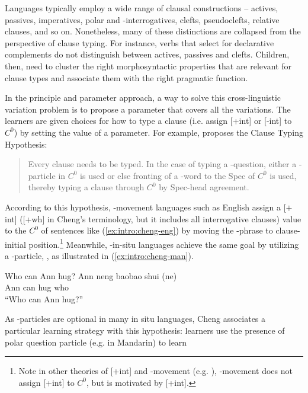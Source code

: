Languages typically employ a wide range of clausal constructions -- actives, passives, imperatives, polar and \twh-interrogatives, clefts, pseudoclefts, relative clauses, and so on. Nonetheless, many of these distinctions are collapsed from the perspective of clause typing. For instance, verbs that select for declarative complements do not distinguish between actives, passives and clefts. Children, then, need to cluster the right morphosyntactic properties that are relevant for clause types and associate them with the right pragmatic function.




In the principle and parameter approach, a way to solve this cross-linguistic variation problem is to propose a parameter that covers all the variations. The learners are given choices for how to type a clause (i.e. assign [+int] or [-int] to $C^{0}$) by setting the value of a parameter. For example, \textcite{cheng1991} proposes the Clause Typing Hypothesis:

\begin{quote}
Every clause needs to be typed. In the case of typing a \twh-question, either a \twh-particle in $C^{0}$ is used or else fronting of a \twh-word to the Spec of $C^{0}$ is used, thereby typing a clause through $C^{0}$ by Spec-head agreement. \hfill \textcite[p.29]{cheng1991}

\end{quote}


According to this hypothesis, \twh-movement languages such as English assign a [$+$int] ([+wh] in Cheng's terminology, but it includes all interrogative clauses) value to the $C^{0}$ of sentences like (\ref{ex:intro:cheng-eng}) by moving the \twh-phrase to clause-initial position.\footnote{Note in other theories of [+int] and \twh-movement (e.g. \cite{chomsky1995}), \twh-movement does not assign [+int] to $C^{0}$, but is motivated by [+int]. } Meanwhile, \twh-in-situ languages achieve the same goal by utilizing a \twh-particle, , as illustrated in (\ref{ex:intro:cheng-man}).

Who can Ann hug?
\eex
{}
\gll
Ann neng baobao shui (ne)\\
Ann can hug who \Sfp\\
\trans ``Who can Ann hug?''
\eex

As \twh-particles are optional in many in situ languages, Cheng associates a particular learning strategy with this hypothesis: learners use the presence of polar question particle (e.g.  in Mandarin) to learn


